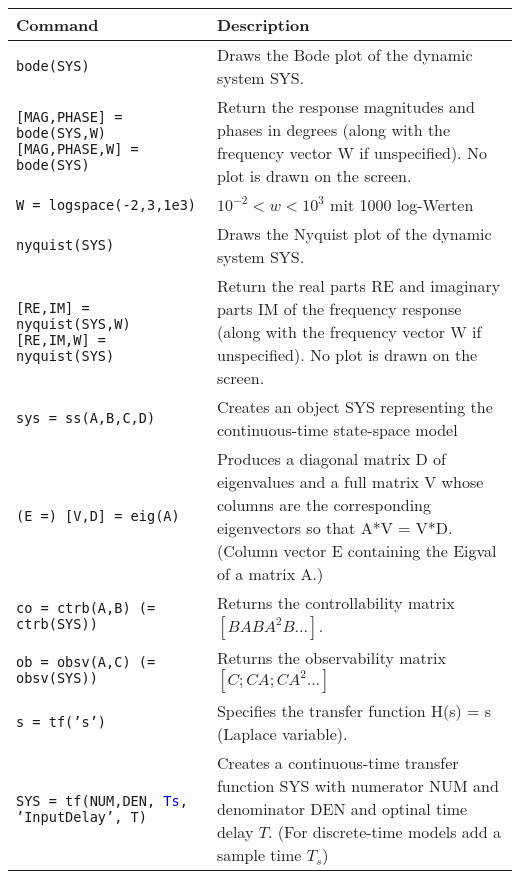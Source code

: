 \begin{center}
    \def\arraystretch{1.5}
    \begin{tabular}{p{5cm}|p{8.5cm}}
        \textbf{Command}    &   \textbf{Description}\\
        \hline
        \texttt{bode(SYS)}  &  Draws the Bode plot of the dynamic system SYS.\\
        
        \texttt{[MAG,PHASE] = bode(SYS,W) [MAG,PHASE,W] = bode(SYS)} & Return the response magnitudes and phases in degrees (along with the frequency vector W if unspecified).  No plot is drawn on the screen. \\
        
        \texttt{W = logspace(-2,3,1e3)} & $10^{-2} < w < 10^3$ mit 1000 log-Werten\\
        
        \texttt{nyquist(SYS)}  &  Draws the Nyquist plot of the dynamic system SYS. \\
        
        \texttt{[RE,IM] = nyquist(SYS,W) [RE,IM,W] = nyquist(SYS)} & Return the real parts RE and imaginary parts IM of the frequency response (along with the frequency vector W if unspecified).  No plot is drawn on the screen. \\
        
        \texttt{sys = ss(A,B,C,D)}  & Creates an object SYS representing the continuous-time state-space model \\
        
        \texttt{(E =) [V,D] = eig(A)}  &  Produces a diagonal matrix D of eigenvalues and a full matrix V whose columns are the corresponding eigenvectors so that A*V = V*D. (Column vector E containing the Eigval of a matrix A.)\\
        
        \texttt{co = ctrb(A,B) (= ctrb(SYS))}  & Returns the controllability matrix $[B AB A^2B ...]$.  \\
        
        \texttt{ob = obsv(A,C) (= obsv(SYS))}  & Returns the observability matrix $[C; CA; CA^2 ...]$ \\
        
        \texttt{s = tf('s')}  & Specifies the transfer function H(s) = s (Laplace variable). \\
        
        \texttt{SYS = tf(NUM,DEN, \textcolor{blue}{Ts}, 'InputDelay', T)} & Creates a continuous-time transfer function SYS with numerator NUM and denominator DEN and optinal time delay $T$. (For discrete-time models add a sample time $T_s$)\\
        

\end{tabular}
\end{center}
